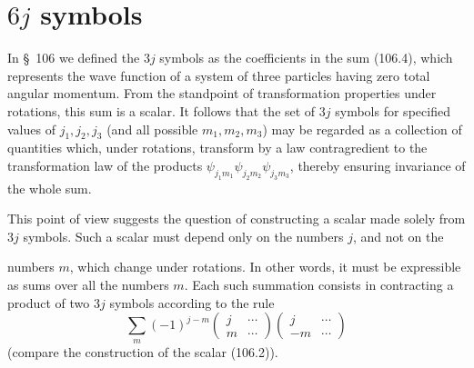 \section{$6j$ symbols}

In \S~106 we defined the $3j$ symbols as the coefficients in the sum (106.4), which represents the wave function of a system of three particles having zero total angular momentum. From the standpoint of transformation properties under rotations, this sum is a scalar. It follows that the set of $3j$ symbols for specified values of $j_1,j_2,j_3$ (and all possible $m_1,m_2,m_3$) may be regarded as a collection of quantities which, under rotations, transform by a law contragredient to the transformation law of the products $\psi_{j_1m_1}\psi_{j_2m_2}\psi_{j_3m_3}$, thereby ensuring invariance of the whole sum.

This point of view suggests the question of constructing a scalar made solely from $3j$ symbols. Such a scalar must depend only on the numbers $j$, and not on the

numbers $m$, which change under rotations. In other words, it must be expressible as sums over all the numbers $m$. Each such summation consists in contracting a product of two $3j$ symbols according to the rule
\begin{equation}
 \sum_m(-1)^{j-m}
 \begin{pmatrix}j&\cdots\\m&\cdots\end{pmatrix}
 \begin{pmatrix}j&\cdots\\-m&\cdots\end{pmatrix}
 \tag{108.1}
\end{equation}
(compare the construction of the scalar (106.2)).

